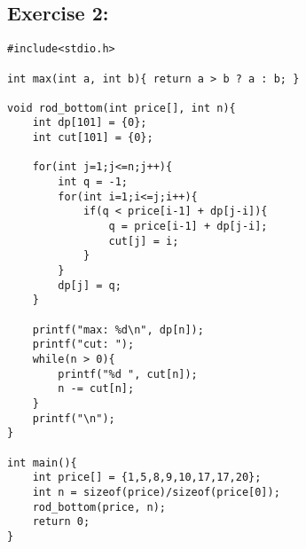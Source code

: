 \documentclass{article}
\begin{document}
\subsection*{Exercise 2:}
\begin{verbatim}
#include<stdio.h>

int max(int a, int b){ return a > b ? a : b; }

void rod_bottom(int price[], int n){
    int dp[101] = {0};
    int cut[101] = {0};

    for(int j=1;j<=n;j++){
        int q = -1;
        for(int i=1;i<=j;i++){
            if(q < price[i-1] + dp[j-i]){
                q = price[i-1] + dp[j-i];
                cut[j] = i;
            }
        }
        dp[j] = q;
    }

    printf("max: %d\n", dp[n]);
    printf("cut: ");
    while(n > 0){
        printf("%d ", cut[n]);
        n -= cut[n];
    }
    printf("\n");
}

int main(){
    int price[] = {1,5,8,9,10,17,17,20};
    int n = sizeof(price)/sizeof(price[0]);
    rod_bottom(price, n);
    return 0;
}
\end{verbatim}
\end{document}

